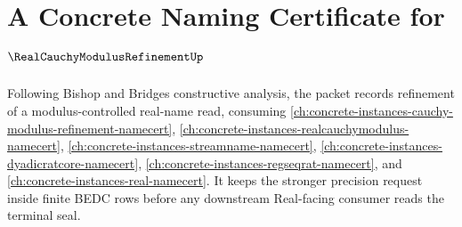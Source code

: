 \chapter{A Concrete Naming Certificate for $\RealCauchyModulusRefinementUp$}
\label{ch:concrete-instances-real-cauchy-modulus-refinement-namecert}

Following Bishop and Bridges constructive analysis, the packet records refinement of a modulus-controlled real-name read, consuming \autoref{ch:concrete-instances-cauchy-modulus-refinement-namecert}, \autoref{ch:concrete-instances-realcauchymodulus-namecert}, \autoref{ch:concrete-instances-streamname-namecert}, \autoref{ch:concrete-instances-dyadicratcore-namecert}, \autoref{ch:concrete-instances-regseqrat-namecert}, and \autoref{ch:concrete-instances-real-namecert}. It keeps the stronger precision request inside finite BEDC rows before any downstream Real-facing consumer reads the terminal seal.

